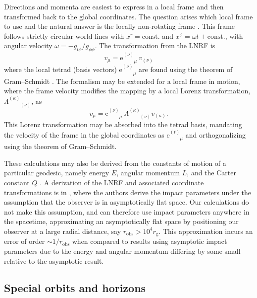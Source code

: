 \documentclass[fleqn,usenatbib]{mnras}
\newcommand{\e}{\text{e}}
\newcommand{\rg}{r_\text{g}}
\newcommand{\utensor}[3]{#1^{#2}_{\phantom{#2}#3}}
\begin{document}
Directions and momenta are easiest to express in a local frame and then
transformed back to the global coordinates. The question arises which local
frame to use and the natural answer is the locally non-rotating frame
\citep[LNRF;][]{bardeen_rotating_1972}. This frame follows strictly circular
world lines with $x^r = \text{const.}$ and $x^\phi = \omega t + \text{const.}$,
with angular velocity $\omega = -g_{t\phi} / g_{\phi\phi}$. The transformation
from the LNRF is
\begin{equation}
    \label{eq:local-to-global-velocity}
    v_\mu = \e^{(\nu)}_{\phantom{(\nu)}\mu}\  v_{(\nu)}
\end{equation}
where the local tetrad (basis vectors) $\e^{(\nu)}_{\phantom{(\nu)}\mu}$ are
found using the theorem of Gram--Schmidt \citep[][Appendix
\ref{appendix:gram-schmidt}]{schmidt_uber_1989}. The formalism may be extended
for a local frame in motion, where the frame velocity modifies the mapping by a
local Lorenz transformation, $\Lambda^{(\kappa)}_{\phantom{(\kappa)}(\nu)}$, as
\begin{equation}
    v_\mu = \e^{(\nu)}_{\phantom{(\nu)}\mu}\  \Lambda^{(\kappa)}_{\phantom{(a)}(\nu)} v_{(\kappa)}.
\end{equation}
This Lorenz transformation may be absorbed into the tetrad basis, mandating the
velocity of the frame in the global coordinates as $\utensor{\e}{(t)}{\mu}$ and
orthogonalizing using the theorem of Gram--Schmidt.

These calculations may also be derived from the constants of motion of a
particular geodesic, namely energy $E$, angular momentum $L$, and the Carter
constant $Q$ \citep{carter_global_1968}. A
derivation of the LNRF and associated coordinate transformations is in
\citet{cunningham_optical_1973}, where the authors derive the impact parameters under
the assumption that the observer is in asymptotically flat space. Our
calculations do not make this assumption, and can therefore use impact
parameters anywhere in the spacetime, approximating an asymptotically flat
space by positioning our observer at a large radial distance, say $r_\text{obs}
> 10^4 \rg$. This approximation incurs an error of order $\sim1/r_\text{obs}$
when compared to results using asymptotic impact parameters due to the energy and
angular momentum differing by some small relative to the asymptotic result.

\subsection{Special orbits and horizons}
\label{sec:special-orbits}
\end{document}
